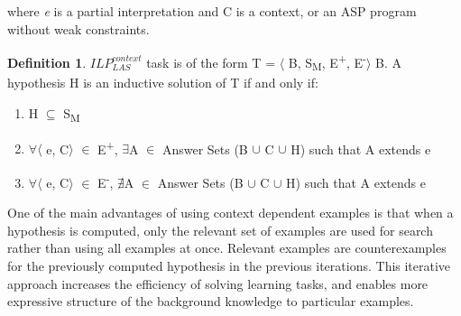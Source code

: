 \documentclass[11pt,twoside]{report}
\theoremstyle{plain}
\theoremstyle{definition}
\newtheorem{defn}[thm]{Definition} %
\begin{document}
where \textit{e} is a partial interpretation and C is a context, or an ASP program without weak constraints.


%
\begin{defn} \label{def:las_context}
$ILP_{LAS}^{context}$ task is of the form T = $\langle$ B, S\textsubscript{M}, E\textsuperscript{+}, E\textsuperscript{-}$\rangle$ B.
A hypothesis H is an inductive solution of T if and only if:
\begin{enumerate}
\item H $\subseteq$ S\textsubscript{M}
\item $\forall$$\langle$ e, C$\rangle$ $\in$ E\textsuperscript{+}, $\exists$A $\in$ Answer Sets (B $\cup$ C $\cup$ H) such that A extends e
\item $\forall$$\langle$ e, C$\rangle$ $\in$ E\textsuperscript{-}, $\nexists$A $\in$ Answer Sets (B $\cup$ C $\cup$ H) such that A extends e
\end{enumerate}
\end{defn}
One of the main advantages of using context dependent examples is that when a hypothesis is computed, only the relevant set of examples are used for search rather than using all examples at once. 
Relevant examples are counterexamples for the previously computed hypothesis in the previous iterations. This iterative approach increases the efficiency of solving learning tasks, and enables more expressive structure of the background knowledge to particular examples. 
\end{document}

